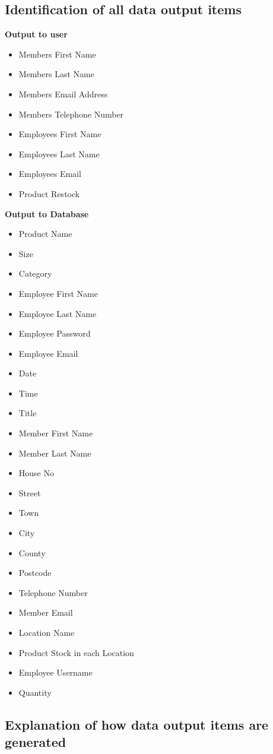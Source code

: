\pagebreak

\subsection{Identification of all data output items}

\textbf{Output to user}
\begin{itemize}
\item Members First Name
\item Members Last Name
\item Members Email Address
\item Members Telephone Number
\item Employees First Name
\item Employees Last Name
\item Employees Email
\item Product Restock
\end{itemize}

\textbf{Output to Database}
\begin{itemize}
\item Product Name
\item Size
\item Category
\item Employee First Name
\item Employee Last Name
\item Employee Password
\item Employee Email
\item Date
\item Time
\item Title
\item Member First Name
\item Member Last Name
\item House No
\item Street
\item Town
\item City
\item County
\item Postcode
\item Telephone Number
\item Member Email
\item Location Name
\item Product Stock in each Location
\item Employee Username
\item Quantity
\end{itemize}
\subsection{Explanation of how data output items are generated}

